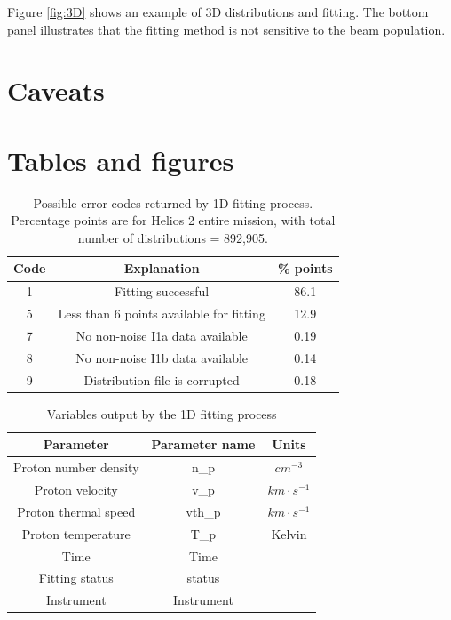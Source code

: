 \documentclass[11pt,a4paper]{article}
\begin{document}
Figure \ref{fig:3D} shows an example of 3D distributions and fitting. The bottom panel illustrates that the fitting method is not sensitive to the beam population.

\section{Caveats}

\appendix
\section{Tables and figures}
\begin{table}[h]
	\centering
	\begin{tabular}{| c | c | c | }
		\hline
		Code &	Explanation 						& \% points\\ \hline \hline
		1 &		Fitting successful					& 86.1 \\ \hline
		5 &		Less than 6 points available for fitting	& 12.9\\ \hline
		7 &		No non-noise I1a data available		& 0.19\\ \hline
		8 & 		No non-noise I1b data available		& 0.14\\ \hline
		9 &		Distribution file is corrupted		& 0.18\\ \hline
	\end{tabular}
	\caption{Possible error codes returned by 1D fitting process. Percentage points are for Helios 2 entire mission, with total number of distributions = 892,905.}
	\label{tab:1D errors}
\end{table}

\begin{table}
	\centering
	\begin{tabular}{| c | c | c |}
		\hline
		Parameter 			& Parameter name	& Units 			\\ \hline \hline \hline
		Proton number density 	& n\_p			& $cm^{-3}$		\\ \hline
		Proton velocity		 	& v\_p			& $km\cdot s^{-1}$	\\ \hline
		Proton thermal speed 	& vth\_p			& $km\cdot s^{-1}$	\\ \hline
		Proton temperature	 	& T\_p			& Kelvin			\\ \hline \hline
		Time				 	& Time			& 				\\ \hline
		Fitting status		 	& status			& 				\\ \hline
		Instrument		 	& Instrument		& 				\\ \hline
	\end{tabular}
	\caption{Variables output by the 1D fitting process}
	\label{tab:1D dict}
\end{table}
\end{document}
